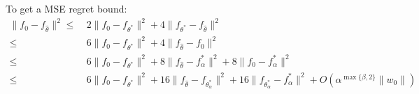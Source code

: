 \documentclass[12pt]{extarticle} %
\newcommand{\error}{\ensuremath{\textsc{Error}}}
\begin{document}
To get a MSE regret bound:
\begin{align*}
    \|f_0-f_{\hat{\theta}}\|^2 \leq ~& 2\|f_0 -f_{\theta^*}\|^2 + 4 \|f_{\theta^*}-f_{\hat{\theta}}\|^2\\
    \leq ~& 6\|f_0 -f_{\theta^*}\|^2 + 4\|f_{\hat{\theta}}-f_0\|^2\\
    \leq ~&  6\|f_0 -f_{\theta^*}\|^2  + 8\|f_{\hat{\theta}}-f_{\alpha}^*\|^2 + 8\|f_0-f_{\alpha}^*\|^2\\
    \leq ~& 6\|f_0 -f_{\theta^*}\|^2 + 16 \|f_{\hat{\theta}}-f_{\theta_{\alpha}^*}\|^2 + 16 \|f_{\theta_{\alpha}^*}-f_{\alpha}^*\|^2 + O\left(\alpha^{\max\{\beta,2\}}\|w_0\|\right)\\
\end{align*}
\end{document}
